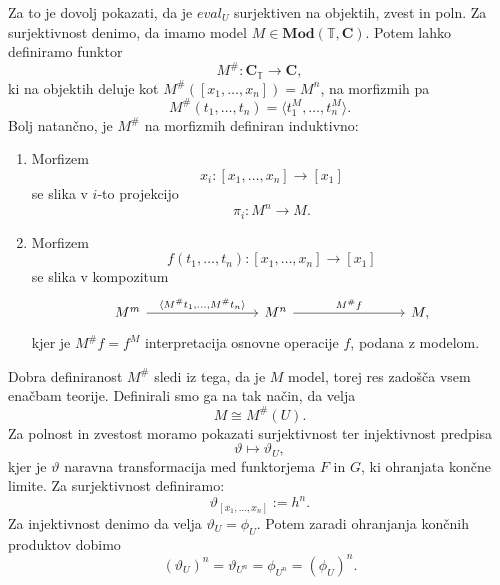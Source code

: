 \documentclass[../kategoricna_logika.tex]{subfiles}
\begin{document}
\begin{dokaz}
Za to je dovolj pokazati, da je $eval_U$ surjektiven na objektih, zvest in poln.
Za surjektivnost denimo, da imamo model
$M \in \mathbf{Mod}(\mathbb{T}, \mathbf{C})$. Potem lahko definiramo funktor
$$M^{\#} : \mathbf{C}_\mathbb{T} \to \mathbf{C},$$
ki na objektih deluje kot $M^{\#}([x_1, \ldots, x_n]) = M^n$, na
morfizmih pa
$$M^{\#}(t_1, \ldots, t_n) = \langle t_1^M, \ldots, t_n^M \rangle.$$
%
Bolj natančno, je $M^{\#}$ na morfizmih definiran induktivno:
\begin{enumerate}
\item Morfizem $$x_i : [x_1, \ldots, x_n] \to [x_1]$$ se slika v
  $i$-to projekcijo $$\pi_i : M^n \to M.$$
\item Morfizem $$f(t_1, \ldots, t_n) : [x_1, \ldots, x_n] \to [x_1]$$
  se slika v kompozitum
\begin{equation*}
    \begin{tikzcd}[column sep = 8em]
      M^m \ar[r, "{\langle M^{\#}t_1, \ldots, M^{\#}t_n \rangle}"] & M^n \ar[r,
      "{M^{\#}f}"] & M,
    \end{tikzcd}
  \end{equation*}
  kjer je $M^{\#}f = f^M$ interpretacija osnovne operacije $f$,
  podana z modelom.
\end{enumerate}
%
Dobra definiranost $M^{\#}$ sledi iz tega, da je $M$ model, torej res zadošča vsem enačbam teorije.
Definirali smo ga na tak način, da velja
$$M \cong M^{\#}(U).$$
%
Za polnost in zvestost moramo pokazati surjektivnost ter injektivnost
predpisa $$\vartheta \mapsto \vartheta_U,$$
kjer je $\vartheta$ naravna transformacija med funktorjema $F$ in $G$, ki ohranjata končne limite.
Za surjektivnost definiramo:
$$\vartheta_{[x_1, \ldots, x_n]} := h^n.$$
Za injektivnost denimo da velja $\vartheta_U = \phi_U $.
Potem zaradi ohranjanja končnih produktov dobimo
\[ (\vartheta_U)^n = \vartheta_{U^n} = \phi_{U^n} = (\phi_U)^n. \]


\end{dokaz}
\end{document}

